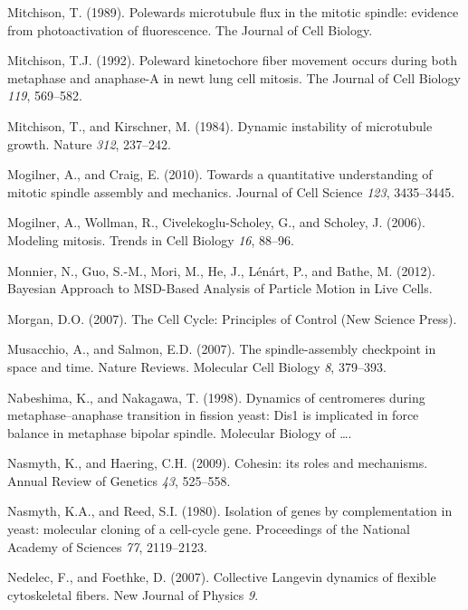 \documentclass[12pt,a4paper,twoside,openright]{book}
\begin{document}
\hypertarget{ref-Mitchison1989}{}
Mitchison, T. (1989). Polewards microtubule flux in the mitotic spindle:
evidence from photoactivation of fluorescence. The Journal of Cell
Biology.

\hypertarget{ref-Mitchison1992}{}
Mitchison, T.J. (1992). Poleward kinetochore fiber movement occurs
during both metaphase and anaphase-A in newt lung cell mitosis. The
Journal of Cell Biology \emph{119}, 569--582.

\hypertarget{ref-Mitchison1984}{}
Mitchison, T., and Kirschner, M. (1984). Dynamic instability of
microtubule growth. Nature \emph{312}, 237--242.

\hypertarget{ref-Mogilner2010}{}
Mogilner, A., and Craig, E. (2010). Towards a quantitative understanding
of mitotic spindle assembly and mechanics. Journal of Cell Science
\emph{123}, 3435--3445.

\hypertarget{ref-Mogilner2006a}{}
Mogilner, A., Wollman, R., Civelekoglu-Scholey, G., and Scholey, J.
(2006). Modeling mitosis. Trends in Cell Biology \emph{16}, 88--96.

\hypertarget{ref-Monnier2012}{}
Monnier, N., Guo, S.-M., Mori, M., He, J., Lénárt, P., and Bathe, M.
(2012). Bayesian Approach to MSD-Based Analysis of Particle Motion in
Live Cells.

\hypertarget{ref-Morgan2007}{}
Morgan, D.O. (2007). The Cell Cycle: Principles of Control (New Science
Press).

\hypertarget{ref-Musacchio2007}{}
Musacchio, A., and Salmon, E.D. (2007). The spindle-assembly checkpoint
in space and time. Nature Reviews. Molecular Cell Biology \emph{8},
379--393.

\hypertarget{ref-Nabeshima1998}{}
Nabeshima, K., and Nakagawa, T. (1998). Dynamics of centromeres during
metaphase--anaphase transition in fission yeast: Dis1 is implicated in
force balance in metaphase bipolar spindle. Molecular Biology of
\ldots{}.

\hypertarget{ref-Nasmyth2009}{}
Nasmyth, K., and Haering, C.H. (2009). Cohesin: its roles and
mechanisms. Annual Review of Genetics \emph{43}, 525--558.

\hypertarget{ref-Nasmyth1980}{}
Nasmyth, K.A., and Reed, S.I. (1980). Isolation of genes by
complementation in yeast: molecular cloning of a cell-cycle gene.
Proceedings of the National Academy of Sciences \emph{77}, 2119--2123.

\hypertarget{ref-Nedelec2007}{}
Nedelec, F., and Foethke, D. (2007). Collective Langevin dynamics of
flexible cytoskeletal fibers. New Journal of Physics \emph{9}.
\end{document}
